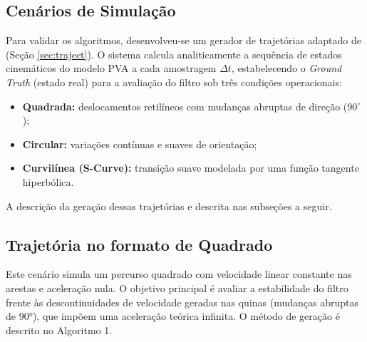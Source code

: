 \documentclass[journal]{IEEEtran}
\begin{document}
\subsection{Cenários de Simulação}

Para validar os algoritmos, desenvolveu-se um gerador de trajetórias adaptado de \cite{falek2020} (Seção \ref{sec:traject}). O sistema calcula analiticamente a sequência de estados cinemáticos do modelo PVA a cada amostragem $\Delta t$, estabelecendo o \textit{Ground Truth} (estado real) para a avaliação do filtro sob três condições operacionais:

\begin{itemize}
    \item \textbf{Quadrada:} deslocamentos retilíneos com mudanças abruptas de direção ($90^\circ$);
    \item \textbf{Circular:} variações contínuas e suaves de orientação;
    \item \textbf{Curvilínea (S-Curve):} transição suave modelada por uma função tangente hiperbólica.
\end{itemize}

A descrição da geração dessas trajetórias e descrita nas subseções a seguir.

\subsection{Trajetória no formato de Quadrado}

Este cenário simula um percurso quadrado com velocidade linear constante nas arestas e aceleração nula. O objetivo principal é avaliar a estabilidade do filtro frente às descontinuidades de velocidade geradas nas quinas (mudanças abruptas de 90°), que impõem uma aceleração teórica infinita. O método de geração é descrito no Algoritmo 1.
\end{document}
